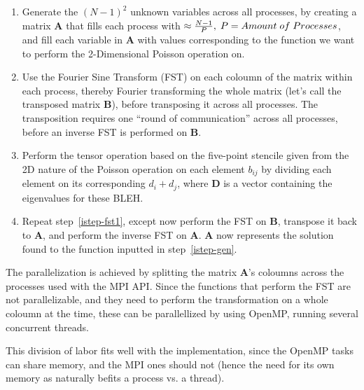 \documentclass[fontsize=11pt,paper=a4,titlepage]{article}
\begin{document}
\begin{enumerate}

	\item \label{istep-gen} Generate the $(N - 1)^2$ unknown variables across
	all processes, by creating a matrix $\mathbf{A}$ that fills each process
	with $\approx \frac{N-1}{P},\thickspace P = Amount\thickspace of\thickspace
	Processes$, and fill each variable in $\mathbf{A}$ with values corresponding
	to the function we want to perform the 2-Dimensional Poisson operation on.

	\item \label{istep-fst1} Use the Fourier Sine Transform (FST) on each
	coloumn of the matrix within each process, thereby Fourier transforming the
	whole matrix (let's call the transposed matrix $\mathbf{B}$), before
	transposing it across all processes. The transposition requires one ``round
	of communication'' across all processes, before an inverse FST is performed
	on $\mathbf{B}$.


	\item \label{istep-tens} Perform the tensor operation based on the
	five-point stencile given from the 2D nature of the Poisson operation on
	each element $b_{ij}$ by dividing each element on its corresponding $d_i +
	d_j$, where $\mathbf{D}$ is a vector containing the eigenvalues for these
	BLEH.

	\item \label{istep-fst2} Repeat step~\ref{istep-fst1}, except now perform
	the FST on $\mathbf{B}$, transpose it back to $\mathbf{A}$, and perform the
	inverse FST on $\mathbf{A}$. $\mathbf{A}$ now represents the solution found
	to the function inputted in step~\ref{istep-gen}.

\end{enumerate}

The parallelization is achieved by splitting the matrix $\mathbf{A}$'s coloumns
across the processes used with the MPI API. Since the functions that perform the
FST are not parallelizable, and they need to perform the transformation on a
whole coloumn at the time, these can be parallellized by using OpenMP, running
several concurrent threads.

This division of labor fits well with the implementation, since the OpenMP tasks
can share memory, and the MPI ones should not (hence the need for its own memory
as naturally befits a process vs. a thread).
\end{document}
